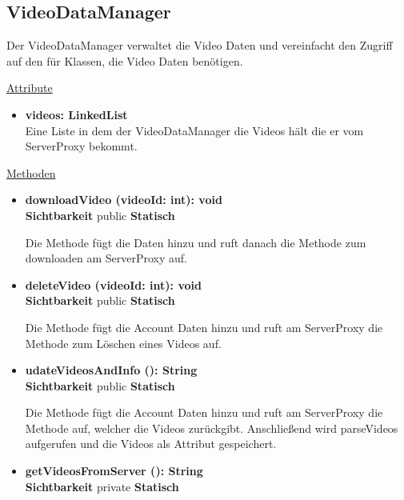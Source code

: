 \newpage
\subsection{VideoDataManager}\label{VideoDataManager}
Der VideoDataManager verwaltet die Video Daten und vereinfacht den Zugriff auf den  für Klassen, die Video Daten benötigen.

\underline{Attribute}
\begin{itemize}
\itemsep0pt

\item \textbf{videos: LinkedList}\hfill\\
Eine Liste in dem der VideoDataManager die Videos hält die er vom ServerProxy bekommt.
\end{itemize}

\underline{Methoden}
\begin{itemize}
\itemsep0pt


\item \textbf{downloadVideo (videoId: int): void}\hfill\\
\textbf{Sichtbarkeit} public \newline
\textbf{Statisch}

Die Methode fügt die  Daten hinzu und ruft danach die Methode zum downloaden am ServerProxy auf.

\item \textbf{deleteVideo (videoId: int): void}\hfill\\
\textbf{Sichtbarkeit} public \newline
\textbf{Statisch}

Die Methode fügt die Account Daten hinzu und ruft am ServerProxy die Methode zum Löschen eines Videos auf.

\item \textbf{udateVideosAndInfo (): String}\hfill\\
\textbf{Sichtbarkeit} public \newline
\textbf{Statisch}

Die Methode fügt die Account Daten hinzu und ruft am ServerProxy die Methode auf, welcher die Videos zurückgibt. Anschließend wird parseVideos aufgerufen und die Videos als Attribut gespeichert.

\item \textbf{getVideosFromServer (): String}\hfill\\
\textbf{Sichtbarkeit} private \newline
\textbf{Statisch}


\end{itemize}
